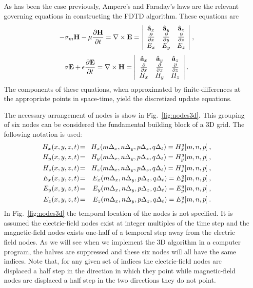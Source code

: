 As has been the case previously, Ampere's and Faraday's laws are the
relevant governing equations in constructing the FDTD algorithm.
These equations are
\begin{equation}
  -\sigma_m\mathbf{H} -\mu \frac{\partial \mathbf{H}}{\partial t} =
  \nabla \times \mathbf{E} =
  \left|
  \begin{array}{ccc}
     \hat{\mathbf{a}}_{x} & \hat{\mathbf{a}}_{y} & \hat{\mathbf{a}}_{z} \\
     \frac{\partial}{\partial x}&
       \frac{\partial}{\partial y}&
       \frac{\partial}{\partial z}  \\
     E_x & E_y & E_z
  \end{array}
  \right|,
 \label{eq:faraday3d}
\end{equation}
\begin{equation}
  \sigma \mathbf{E} + \epsilon \frac{\partial \mathbf{E}}{\partial t} =
  \nabla \times \mathbf{H} =
  \left|
  \begin{array}{ccc}
     \hat{\mathbf{a}}_{x} & \hat{\mathbf{a}}_{y} & \hat{\mathbf{a}}_{z} \\
     \frac{\partial}{\partial x}&
       \frac{\partial}{\partial x}&
       \frac{\partial}{\partial z} \\
     H_x & H_y & H_z
  \end{array}
  \right|.
 \label{eq:ampere3d}
\end{equation}
The components of these equations, when approximated by
finite-differences at the appropriate points in space-time, yield the
discretized update equations.

The necessary arrangement of nodes is show in Fig.\ \ref{fig:nodes3d}.
This grouping of six nodes can be considered the fundamental building
block of a 3D grid.  The following notation is used:
\begin{eqnarray}
  H_x(x,y,z,t) \!&=&\! H_x(m\Delx, n\Dely, p\Delz, q\Delt) =
          \fdtd{H_x}{m,n,p}{q},  \\
  H_y(x,y,z,t) \!&=&\! H_y(m\Delx, n\Dely, p\Delz, q\Delt) =
          \fdtd{H_y}{m,n,p}{q},  \\
  H_z(x,y,z,t) \!&=&\! H_z(m\Delx, n\Dely, p\Delz, q\Delt) =
          \fdtd{H_z}{m,n,p}{q},  \\
  E_x(x,y,z,t) \!&=&\! E_x(m\Delx, n\Dely, p\Delz, q\Delt) =
          \fdtd{E_x}{m,n,p}{q},  \\
  E_y(x,y,z,t) \!&=&\! E_y(m\Delx, n\Dely, p\Delz, q\Delt) =
          \fdtd{E_y}{m,n,p}{q},  \\
  E_z(x,y,z,t) \!&=&\! E_z(m\Delx, n\Dely, p\Delz, q\Delt) =
          \fdtd{E_z}{m,n,p}{q}.
\end{eqnarray}
In Fig.\ \ref{fig:nodes3d} the temporal location of the nodes is not
specified.  It is assumed the electric-field nodes exist at integer
multiples of the time step and the magnetic-field nodes exists
one-half of a temporal step away from the electric field nodes.  As we
will see when we implement the 3D algorithm in a computer program, the
halves are suppressed and these six nodes will all have the same
indices.  Note that, for any given set of indices the electric-field
nodes are displaced a half step in the direction in which they point
while magnetic-field nodes are displaced a half step in the two
directions they do not point.

